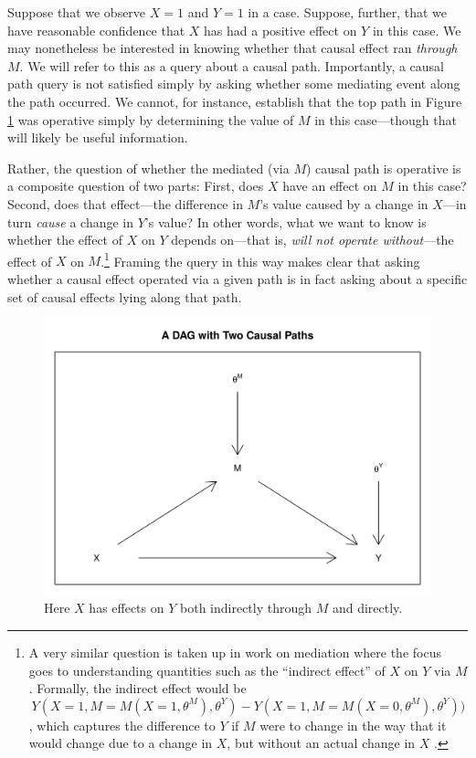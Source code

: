 \documentclass[
  12pt,
]{book}
\begin{document}
Suppose that we observe \(X=1\) and \(Y=1\) in a case. Suppose, further, that we have reasonable confidence that \(X\) has had a positive effect on \(Y\) in this case. We may nonetheless be interested in knowing whether that causal effect ran \emph{through} \(M\). We will refer to this as a query about a causal path. Importantly, a causal path query is not satisfied simply by asking whether some mediating event along the path occurred. We cannot, for instance, establish that the top path in Figure \ref{fig:DAGpaths} was operative simply by determining the value of \(M\) in this case---though that will likely be useful information.

Rather, the question of whether the mediated (via \(M\)) causal path is operative is a composite question of two parts: First, does \(X\) have an effect on \(M\) in this case? Second, does that effect---the difference in \(M\)'s value caused by a change in \(X\)---in turn \emph{cause} a change in \(Y\)'s value? In other words, what we want to know is whether the effect of \(X\) on \(Y\) depends on---that is, \emph{will not operate without}---the effect of \(X\) on \(M\).\footnote{A very similar question is taken up in work on mediation where the focus goes to understanding quantities such as the ``indirect effect'' of \(X\) on \(Y\) via \(M\). Formally, the indirect effect would be \[Y(X=1, M = M(X=1,\theta^M), 
  \theta^Y) - Y(X = 1, M = M(X=0, \theta^M), \theta^Y))\], which captures the difference to \(Y\) if \(M\) were to change in the way that it would change due to a change in \(X\), but without an actual change in \(X\) \citep[ p 132, \citet{imai2010general}]{pearl2009causality}.} Framing the query in this way makes clear that asking whether a causal effect operated via a given path is in fact asking about a specific set of causal effects lying along that path.

\begin{figure}

{\centering \includegraphics[width=0.6\linewidth]{ii_files/figure-latex/DAGpaths-1} 

}

\caption{\label{fig:DAGpaths} Here $X$ has effects on $Y$ both indirectly through $M$ and directly.}\label{fig:DAGpaths}
\end{figure}
\end{document}
